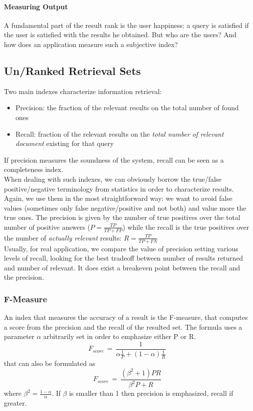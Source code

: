 \documentclass{article}
\begin{document}
			\paragraph{Measuring Output}
				A fundamental part of the result rank is the user happiness: a query is satisfied if the user is satisfied with the results he obtained. But who are the users? And how does an application measure such a subjective index?

		\subsection{Un/Ranked Retrieval Sets}
			Two main indexes characterize information retrieval:
			\begin{itemize}
				\item Precision: the fraction of the relevant results on the total number of found ones
				\item Recall: fraction of the relevant results on the \textit{total number of relevant document} existing for that query
			\end{itemize}
			If precision measures the soundness of the system, recall can be seen as a completeness index.\\
			When dealing with such indexes, we can obviously borrow the true/false positive/negative terminology from statistics in order to characterize results. Again, we use them in the most straightforward way: we want to avoid false values (sometimes only false negative/positive and not both) and value more the true ones. The precision is given by the number of true positives over the total number of positive answers ($P = \frac{TP}{TP + FP}$) while the recall is the true positives over the number of \textit{actually relevant} results: $R = \frac{TP}{TP + FN}$\\
			Usually, for real application, we compare the value of precision setting various levels of recall, looking for the best tradeoff between number of results returned and number of relevant. It does exist a breakeven point between the recall and the precision. 

			\subsubsection{F-Measure}
				An index that measures the accuracy of a result is the F-measure, that computes a score from the precision and the recall of the resulted set. The formula uses a parameter $\alpha$ arbitrarily set in order to emphasize either P or R.
				\begin{equation}
					F_{score}\, =\, \frac{1}{\alpha \frac{1}{P} + (1 - \alpha)\frac{1}{R}}
				\end{equation}
				that can also be formulated as
				\begin{equation}
					F_{score}\, =\, \frac{(\beta^2 + 1)PR}{\beta^2P + R}
				\end{equation}
				where $\beta^2 = \frac{1 - \alpha}{\alpha}$. If $\beta$ is smaller than 1 then precision is emphasized, recall if greater.
\end{document}

